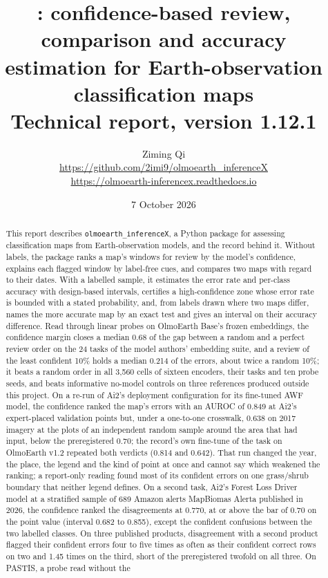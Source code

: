 \documentclass[11pt,a4paper]{article}
\title{\pkg: confidence-based review, comparison and accuracy estimation for Earth-observation classification maps\\[6pt]
\large Technical report, version 1.12.1}
\author{Ziming Qi\\[2pt] \small \url{https://github.com/2imi9/olmoearth_inferenceX}\\[-1pt]
\small \url{https://olmoearth-inferencex.readthedocs.io}}
\date{7 October 2026}
\newcommand{\pkg}{\texttt{olmoearth\_inferenceX}}
\begin{document}
\maketitle

\begin{abstract}
This report describes \pkg, a Python package for assessing classification maps from Earth-observation models, and
the record behind it. Without labels, the package ranks a map's windows for review by the model's confidence,
explains each flagged window by label-free cues, and compares two maps with regard to their dates. With a labelled
sample, it estimates the error rate and per-class accuracy with design-based intervals, certifies a high-confidence
zone whose error rate is bounded with a stated probability, and, from labels drawn where two maps differ, names the
more accurate map by an exact test and gives an interval on their accuracy difference. Read through linear probes on OlmoEarth Base's frozen embeddings, the confidence margin
closes a median 0.68 of the gap between a random and a perfect review order on the 24 tasks of the model authors'
embedding suite, and a review of the least confident 10\% holds a median 0.214 of the errors, about twice a random
10\%; it beats a random order in all 3,560 cells of sixteen encoders, their tasks and ten probe seeds, and beats
informative no-model controls on three references produced outside this project. On a re-run of Ai2's deployment configuration for its fine-tuned AWF model, the
confidence ranked the map's errors with an AUROC of 0.849 at Ai2's expert-placed validation points but, under a
one-to-one crosswalk, 0.638 on 2017 imagery at the plots of an independent random sample around the area that had
input, below the preregistered 0.70; the record's own fine-tune of the task on OlmoEarth v1.2 repeated both verdicts
(0.814 and 0.642). That run changed the year, the place, the legend and the kind of point at once and cannot say which
weakened the ranking; a report-only reading found most of its confident errors on one grass/shrub boundary that neither
legend defines. On a second task, Ai2's Forest Loss Driver model at a stratified sample of 689 Amazon alerts
MapBiomas Alerta published in 2026, the confidence ranked the disagreements at 0.770, at or above the bar of 0.70 on the point value
(interval 0.682 to 0.855), except the confident confusions between the two labelled classes. On three published
products, disagreement with a second product flagged their confident errors four to five times as often as their
confident correct rows on two and 1.45 times on the third, short of the preregistered twofold on all three. On PASTIS, a probe read without the

\end{abstract}
\end{document}

